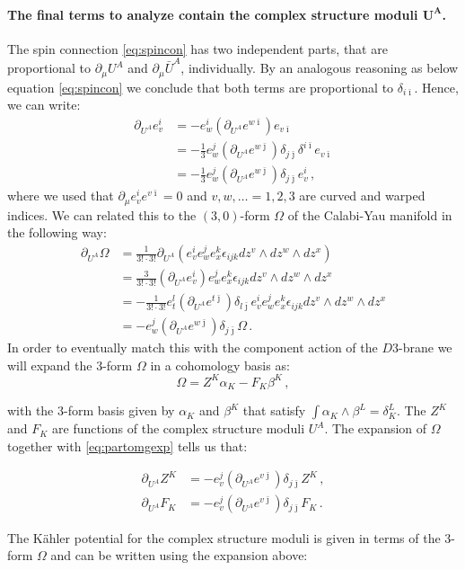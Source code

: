 \documentclass[a4paper,12pt]{report}
\newcommand{\be}{\begin{equation}}
\newcommand{\ee}{\end{equation}}
\newcommand{\bea}{\begin{equation}\begin{aligned}}
\newcommand{\eea}{\end{aligned}\end{equation}}
\def\ib{{\bar \imath}}
\def\jb{{\bar \jmath}}
\begin{document}
\paragraph{The final terms to analyze contain the complex structure moduli $\mathbf{U^A}$.} The spin connection \eqref{eq:spincon} has two independent parts, that are proportional to $\partial_\mu U^A$ and $\partial_\mu \bar{U}^A$, individually. By an analogous reasoning as below equation \eqref{eq:spincon} we conclude that both terms are proportional to $\delta_{i\ib}$. Hence,  we can write:
\bea
\partial_{U^A} e^i_v 
&= - e^i_{w} (\partial_{U^A} e^{w\ib} ) e_{v\ib}\\
&= -\frac{1}{3} e^j_w (\partial_{U^A} e^{w\jb} ) \delta_{j\jb} \delta^{i\ib} e_{v\ib}\\
&= -\frac{1}{3} e^j_w (\partial_{U^A} e^{w\jb} ) \delta_{j\jb}  e^i_{v}\,,
\eea
where we used that $\partial_\mu e^i_v e^{v\ib} = 0$ and $v,w,\ldots = 1,2,3$ are curved and warped indices. We can related this to the $(3,0)$-form $\Omega$ of the Calabi-Yau manifold in the following way:
\bea
\partial_{U^A} \Omega &= \frac{1}{3! \cdot 3!} \partial_{U^A} \left( e^i_v e^j_w e^k_x \epsilon_{ijk} dz^v \wedge dz^w \wedge dz^x\right)\\
&= \frac{3}{3! \cdot 3!} \left(\partial_{U^A}  e^i_v\right) e^j_w e^k_x \epsilon_{ijk} dz^v \wedge dz^w \wedge dz^x\\
&= - \frac{1}{3! \cdot 3!} e^l_t \left(\partial_{U^A} e^{t\jb}\right) \delta_{l\jb} e^i_v e^j_w e^k_x \epsilon_{ijk} dz^v \wedge dz^w \wedge dz^x\\
&= -e^j_w \left(\partial_{U^A} e^{w\jb} \right) \delta_{j\jb} \Omega\,.
\label{eq:partomgexp}
\eea
In order to eventually match this with the component action of the $D3$-brane we will expand the 3-form $\Omega$ in a cohomology basis as:
\be 
\Omega = Z^K \alpha_K - F_K \beta^K\,,
\ee

with the 3-form basis given by $\alpha_K$ and $\beta^K$ that satisfy $\int \alpha_K \wedge \beta^L = \delta^L_K$. The $Z^K$ and $F_K$ are functions of the complex structure moduli $U^A$. The expansion of $\Omega$ together with \eqref{eq:partomgexp} tells us that:

\bea 
\partial_{U^A} Z^K &= - e^j_v \left(\partial_{U^A} e^{v\jb} \right) \delta_{j\jb} Z^K\,,\\
\partial_{U^A} F_K &= -e^j_v \left(\partial_{U^A} e^{v\jb}\right) \delta_{j\jb} F_K\,.
\eea

The Kähler potential for the complex structure moduli is given in terms of the 3-form $\Omega$ and can be written using the expansion above:
\end{document}

